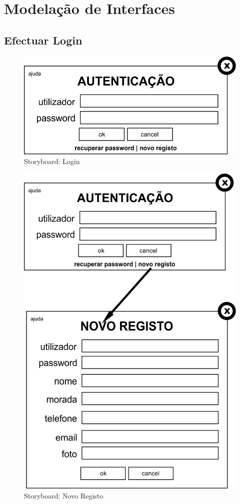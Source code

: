 \chapter{Modelação de Interfaces}

\section{Efectuar Login}
\begin{figure}[!htbp]
\centering
\includegraphics{imagens/login_i.jpg}
\caption{Storyboard: Login}
\label{fig:login_i}
\end{figure}

\begin{figure}[!htbp]
\centering
\includegraphics{imagens/novo_registo_i.jpg}
\caption{Storyboard: Novo Registo}
\label{fig:novo_registo_i}
\end{figure}

